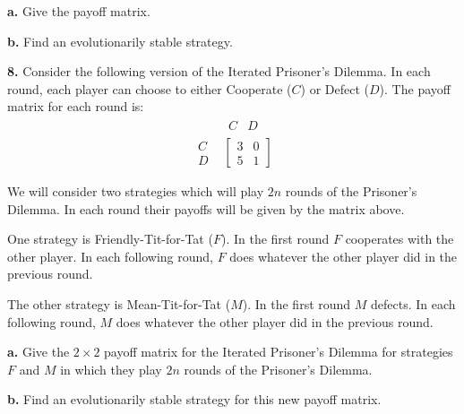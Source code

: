 \documentclass[reqno,12pt]{amsart}
\begin{document}
\noindent
{\bf a.}  Give the payoff matrix.

\noindent
{\bf b.}  Find an evolutionarily stable strategy.


\vspace{3cm}

\noindent
{\bf 8.}  Consider the following version of the Iterated Prisoner's
Dilemma.  In each round, each player can choose to either Cooperate ($C$)
or Defect ($D$).  The payoff matrix for each round is:
$$
\begin{matrix}
  & \begin{matrix} C & D \end{matrix} 	\\
\begin{matrix} C \\ D \end{matrix}		&
\begin{bmatrix}
3 & 0 	\\
5 & 1
\end{bmatrix}
\end{matrix}
$$

\vspace{.3cm}

We will consider two strategies which will play $2n$ rounds of the
Prisoner's Dilemma.  In each round their payoffs will be given by
the matrix above.

\vspace{.3cm}

One strategy is {Friendly-Tit-for-Tat} ($F$).  In the first round
$F$ cooperates with the other player.  In each following round, $F$
does whatever the other player did in the previous round.

\vspace{.3cm}

The other strategy is {Mean-Tit-for-Tat} ($M$).  In the first round
$M$ defects.  In each following round, $M$ does whatever the other
player did in the previous round.

\vspace{.3cm}

\noindent
{\bf a.}  Give the $2 \times 2$ payoff matrix for the Iterated Prisoner's
Dilemma for strategies $F$ and $M$ in which they play $2n$ rounds of the
Prisoner's Dilemma.

\vspace{.3cm}

\noindent
{\bf b.}  Find an evolutionarily stable strategy for this new payoff
matrix.
\end{document}
